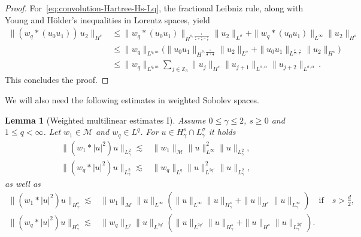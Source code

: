 \documentclass[12pt]{article}
\theoremstyle{plain}
\newtheorem{lemma}[theo]{Lemma}
\newcommand{\meas}{\mathcal{M}}
\begin{document}
\begin{proof}
For~\eqref{eq:convolution-Hartree-Hs-Lq}, the fractional Leibniz rule, along with Young and H\"older's inequalities in Lorentz spaces, yield
\begin{align*}
  \|(w_{q}*(u_{0}u_{1}))\,u_{2}\|_{H^{s}}
 & \leq\|w_{q}*(u_{0}u_{1})\|_{H^{s,\frac{1}{\frac{1}{\sigma}+\frac{1}{q}-\frac{1}{2}}}}\|u_{2}\|_{L^{\sigma}}+\|w_{q}*(u_{0}u_{1})\|_{L^{\infty}}\|u_{2}\|_{H^{s}}\\
 & \leq\|w_{q}\|_{L^{q,m}}\big(\|u_{0}u_{1}\|_{H^{s,\frac{1}{\frac{1}{\sigma}+\frac{1}{2}}}}\|u_{2}\|_{L^{\sigma}}+\|u_{0}u_{1}\|_{L^{\frac{\sigma}{2},\frac{\alpha}{2}}}\|u_{2}\|_{H^{s}}\big)\\
 & \leq\|w_{q}\|_{L^{q,m}}\sum_{j\in\mathbb{Z}_{3}}\|u_{j}\|_{H^{s}}\|u_{j+1}\|_{L^{\sigma,\alpha}}\|u_{j+2}\|_{L^{\sigma,\alpha}}\,.
\end{align*}
This concludes the proof.
\end{proof}

We will also need the following estimates in weighted Sobolev spaces.

\begin{lemma}[Weighted multilinear estimates I]
\label{lemma: weight multilin}
Assume $0\le \gamma \le 2$, $s\ge 0$ and $1 \leq q <\infty$. Let $w _1\in \meas $ and $w_q \in L^q$. For $ u   \in H^s_\gamma \cap L^\sigma_\gamma$ it holds
\begin{align}
    \|(w_1*|u|^2)u \|_{
L^2_\gamma} \lesssim & \|w_1\|_{\meas} \|u\|_{L^\infty} ^2 \|u \|_{L^2_\gamma}, \label{eq: weighted multilin M1 in L2}\\
\|(w_q*|u|^2)u \|_{L^2_\gamma} \lesssim & \|w_q\|_{L^q}
    \|u\|_{L^{2q'}}^2 \|u\|_{L^2_\gamma}, \label{eq: weighted multilin Lq in L2}
    \end{align}
as well as
\begin{align}
\|(w_1*|u|^2)u \|_{H^s_\gamma} \lesssim & \|w_1\|_{\meas} \|u\|_{L^\infty} (\|u\|_{L^\infty}  \|u \|_{H^s_\gamma}  + \|u\|_{H^s}\|u \|_{L^\infty_\gamma})\quad \textrm{if}\quad s>\frac{d}{2}, \label{eq: weighted multilin M in Hs}\\
      \|(w_q*|u|^2)u \|_{H^s_\gamma} \lesssim & \|w_q\|_{L^q}
    \|u\|_{L^{2q'}}(\|u\|_{L^{2q'}}\| u \|_{H^s_\gamma} + \|u \|_{H^s}\| u \|_{L^{2q'}_\gamma}). \label{eq: weighted multilin Lq in Hs}
          \end{align}

    
\end{lemma}
\end{document}
